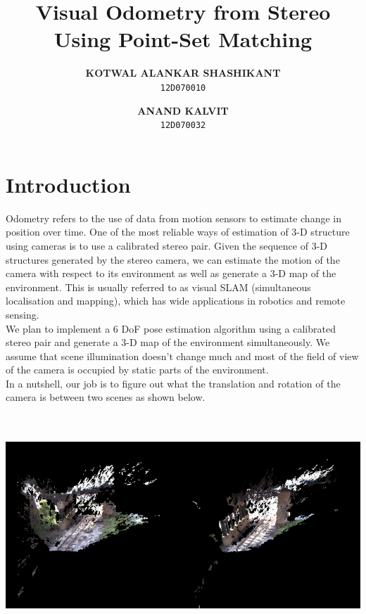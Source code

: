 \documentclass[11pt, a4paper]{article}
\author{
  \textbf{KOTWAL ALANKAR SHASHIKANT}\\
  \texttt{12D070010}
  \and
  \textbf{ANAND KALVIT}\\
  \texttt{12D070032}
}
\title{Visual Odometry from Stereo Using Point-Set Matching}
\begin{document}
\maketitle
\newpage

\section{Introduction}
Odometry refers to the use of data from motion sensors to estimate change in position over time. One of the most reliable ways of estimation of 3-D structure using cameras is to use a calibrated stereo pair. Given the sequence of 3-D structures generated by the stereo camera, we can estimate the motion of the camera with respect to its environment as well as generate a 3-D map of the environment. This is usually referred to as visual SLAM (simultaneous localisation and mapping), which has wide applications in robotics and remote sensing. \\

\noindent We plan to implement a 6 DoF pose estimation algorithm using a calibrated stereo pair and generate a 3-D map of the environment simultaneously. We assume that scene illumination doesn't change much and most of the field of view of the camera is occupied by static parts of the environment. \\

\noindent In a nutshell, our job is to figure out what the translation and rotation of the camera is between two scenes as shown below. \\ \\ \\
\centerline{\includegraphics[scale=0.50]{pointclouds}}
\newpage
\end{document}
